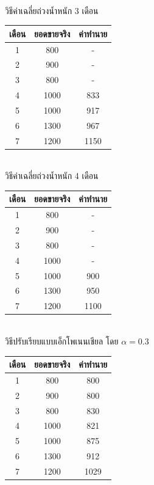 \vspace{1cm}\\
วิธีค่าเฉลี่ยถ่วงน้ำหนัก 3 เดือน\\
\begin{tabular}{|c|c|c|}
	\hline
	เดือน & ยอดขายจริง & ค่าทำนาย \\ \hline
	1     & 800        &  -             \\ \hline
	2     & 900        &  -          \\ \hline
	3     & 800        &  -          \\ \hline
	4     & 1000       & 833           \\ \hline
	5     & 1000       & 917           \\ \hline
	6     & 1300       & 967           \\ \hline
	7     & 1200       & 1150           \\ \hline
\end{tabular}
\vspace{1cm}\\
วิธีค่าเฉลี่ยถ่วงน้ำหนัก 4 เดือน\\
\begin{tabular}{|c|c|c|}
	\hline
	เดือน & ยอดขายจริง & ค่าทำนาย \\ \hline
	1     & 800        &   -            \\ \hline
	2     & 900        &   -         \\ \hline
	3     & 800        &  -          \\ \hline
	4     & 1000       &  -          \\ \hline
	5     & 1000       & 900           \\ \hline
	6     & 1300       & 950           \\ \hline
	7     & 1200       & 1100           \\ \hline
\end{tabular}
\vspace{1cm}\\
วิธีปรับเรียบแบบเอ็กโพเนนเชียล โดย $\alpha=0.3$\\
\begin{tabular}{|c|c|c|}
	\hline
	เดือน & ยอดขายจริง & ค่าทำนาย \\ \hline
	1     & 800        & 800              \\ \hline
	2     & 900        & 800           \\ \hline
	3     & 800        & 830           \\ \hline
	4     & 1000       & 821           \\ \hline
	5     & 1000       & 875           \\ \hline
	6     & 1300       & 912           \\ \hline
	7     & 1200       & 1029           \\ \hline
\end{tabular}
